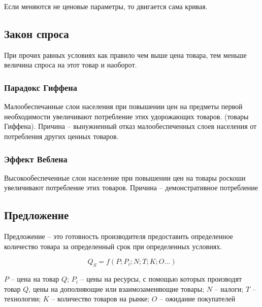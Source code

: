 Если меняются не ценовые параметры, то двигается сама кривая.

\subsection{Закон спроса}

При прочих равных условиях как правило чем выше цена товара, тем меньше величина спроса на этот товар и наоборот.

\subsubsection{Парадокс Гиффена}

Малообеспечанные слои населения при повышении цен на предметы первой необходимости увеличивают потребление этих удорожающих товаров. (товары Гиффена). Причина -- вынужненный отказ малообеспеченных слоев населения от потребления других ценных товаров.

\subsubsection{Эффект Веблена}

Высокообеспеченные слои население при повышении цен на товары роскоши увеличивают потребление этих товаров. Причина -- демонстративное потребление

\subsection{Предложение}

Предложение -- это готовность производителя предоставить определенное количество товара за определенный срок при определенных условиях.

\begin{equation}
    Q_S = f(P; P_i; N; T; K; O ...)
\end{equation}

$P$ -- цена на товар $Q$;
$P_i$ -- цены на ресурсы, с помощью которых производят товар $Q$, цены на дополняющие или взаимозаменяющие товары;
$N$ -- налоги;
$T$ -- технологии;
$K$ -- количество товаров на рынке;
$O$ -- ожидание покупателей

